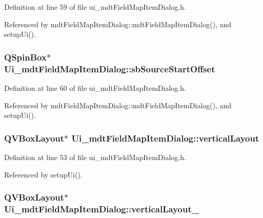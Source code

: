 Definition at line 59 of file ui\-\_\-mdt\-Field\-Map\-Item\-Dialog.\-h.



Referenced by mdt\-Field\-Map\-Item\-Dialog\-::mdt\-Field\-Map\-Item\-Dialog(), and setup\-Ui().

\hypertarget{class_ui__mdt_field_map_item_dialog_a9c8f4b9659e57c4af734d2c4b4750cbf}{
\subsubsection[{sb\-Source\-Start\-Offset}]{\setlength{\rightskip}{0pt plus 5cm}Q\-Spin\-Box$\ast$ Ui\-\_\-mdt\-Field\-Map\-Item\-Dialog\-::sb\-Source\-Start\-Offset}}\label{class_ui__mdt_field_map_item_dialog_a9c8f4b9659e57c4af734d2c4b4750cbf}


Definition at line 60 of file ui\-\_\-mdt\-Field\-Map\-Item\-Dialog.\-h.



Referenced by mdt\-Field\-Map\-Item\-Dialog\-::mdt\-Field\-Map\-Item\-Dialog(), and setup\-Ui().

\hypertarget{class_ui__mdt_field_map_item_dialog_a055ad6e04145a347caad4052c37613ad}{
\subsubsection[{vertical\-Layout}]{\setlength{\rightskip}{0pt plus 5cm}Q\-V\-Box\-Layout$\ast$ Ui\-\_\-mdt\-Field\-Map\-Item\-Dialog\-::vertical\-Layout}}\label{class_ui__mdt_field_map_item_dialog_a055ad6e04145a347caad4052c37613ad}


Definition at line 53 of file ui\-\_\-mdt\-Field\-Map\-Item\-Dialog.\-h.



Referenced by setup\-Ui().

\hypertarget{class_ui__mdt_field_map_item_dialog_a82853f9f0f0dd223a85acd1d02e3a913}{
\subsubsection[{vertical\-Layout\-\_\-2}]{\setlength{\rightskip}{0pt plus 5cm}Q\-V\-Box\-Layout$\ast$ Ui\-\_\-mdt\-Field\-Map\-Item\-Dialog\-::vertical\-Layout\-\_}}\label{class_ui__mdt_field_map_item_dialog_a82853f9f0f0dd223a85acd1d02e3a913}



